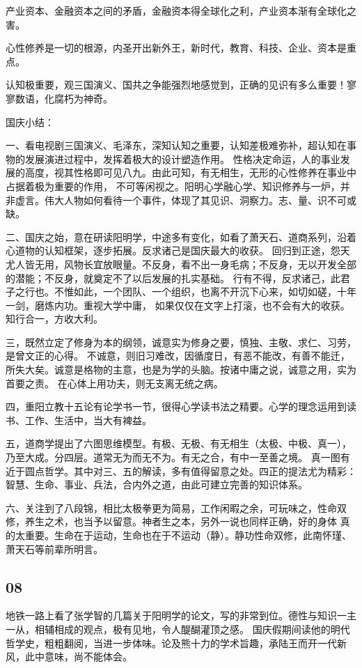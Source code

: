 产业资本、金融资本之间的矛盾，金融资本得全球化之利，产业资本渐有全球化之害。

心性修养是一切的根源，内圣开出新外王，新时代，教育、科技、企业、资本是重点。

认知极重要，观三国演义、国共之争能强烈地感觉到，正确的见识有多么重要！寥寥数语，化腐朽为神奇。

国庆小结：

一、看电视剧三国演义、毛泽东，深知认知之重要，认知差极难弥补，超认知在事物的发展演进过程中，发挥着极大的设计塑造作用。
性格决定命运，人的事业发展的高度，视其性格即可见八九。由此可知，有无相生，无形的心性修养在事业中占据着极为重要的作用，
不可等闲视之。阳明心学融心学、知识修养与一炉，并非虚言。伟大人物如何看待一个事件，体现了其见识、洞察力。志、量、识不可或缺。

二、国庆之始，意在研读阳明学，中途多有变化，如看了萧天石、道商系列，沿着心道物的认知框架，逐步拓展。反求诸己是国庆最大的收获。
回归到正途，怨天尤人皆无用，风物长宜放眼量。不反身，看不出一身毛病；不反身，无以开发全部的潜能；不反身，就奠定不了以后发展的扎实基础。
行有不得，反求诸己，此君子之行也。不惟如此，一个团队、一个组织，也离不开沉下心来，如切如磋，十年一剑，磨炼内功。重视大学中庸，
如果仅仅在文字上打滚，也不会有大的收获。知行合一，方收大利。

三，既然立定了修身为本的纲领，诚意实为修身之要，慎独、主敬、求仁、习劳，是曾文正的心得。
不诚意，则旧习难改，因循度日，有恶不能改，有善不能迁，所失大矣。诚意是格物的主意，也是为学的头脑。按诸中庸之说，诚意之用，实为首要之责。
在心体上用功夫，则无支离无统之病。

四，重阳立教十五论有论学书一节，很得心学读书法之精要。心学的理念运用到读书、工作、生活中，当大有裨益。

五，道商学提出了六图思维模型。有极、无极、有无相生（太极、中极、真一），乃至大成。分四层。道常无为而无不为。有无之合，有中一至善之境。
真一图有近于圆点哲学。其中对三、五的解读，多有值得留意之处。四正的提法尤为精彩：智慧、生命、事业、兵法，合内外之道，由此可建立完善的知识体系。

六、关注到了八段锦，相比太极拳更为简易，工作闲暇之余，可玩味之，性命双修，养生之术，也当予以留意。神者生之本，另外一说也同样正确，好的身体
真的太重要。生命在于运动，生命也在于不运动（静）。静功性命双修，此南怀瑾、萧天石等前辈所明言。

\subsection{08}

地铁一路上看了张学智的几篇关于阳明学的论文，写的非常到位。德性与知识一主一从，相辅相成的观点，极有见地，令人醍醐灌顶之感。
国庆假期间读他的明代哲学史，粗粗翻阅，当进一步体味。论及熊十力的学术旨趣，承陆王而开一代新风，此中意味，尚不能体会。

